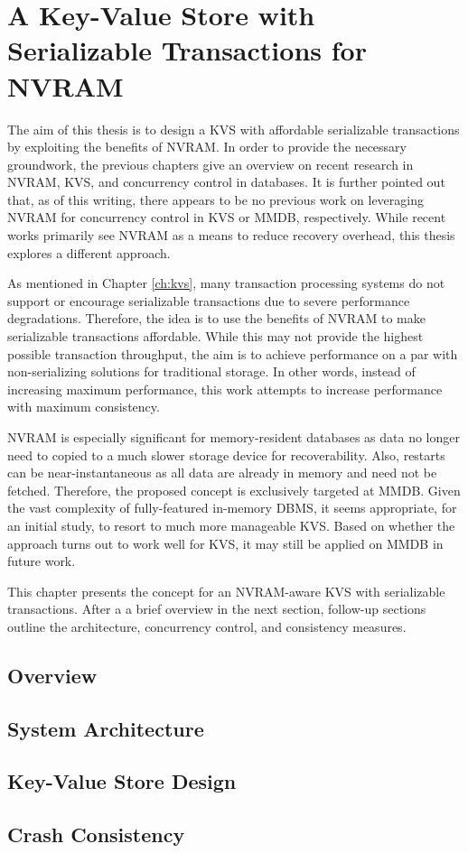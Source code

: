 \chapter{A Key-Value Store with Serializable Transactions for NVRAM}
\label{ch:concept}

The aim of this thesis is to design a KVS with affordable serializable
transactions by exploiting the benefits of NVRAM. In order to provide the
necessary groundwork, the previous chapters give an overview on recent research
in NVRAM, KVS, and concurrency control in databases. It is further pointed out
that, as of this writing, there appears to be no previous work on leveraging
NVRAM for concurrency control in KVS or MMDB, respectively. While recent works
primarily see NVRAM as a means to reduce recovery overhead, this thesis explores
a different approach.

As mentioned in Chapter \ref{ch:kvs}, many transaction processing systems do not
support or encourage serializable transactions due to severe performance
degradations. Therefore, the idea is to use the benefits of NVRAM to make
serializable transactions affordable. While this may not provide the highest
possible transaction throughput, the aim is to achieve performance on a par with
non-serializing solutions for traditional storage. In other words, instead of
increasing maximum performance, this work attempts to increase performance with
maximum consistency.

NVRAM is especially significant for memory-resident databases as data no longer
need to copied to a much slower storage device for recoverability. Also,
restarts can be near-instantaneous as all data are already in memory and need
not be fetched. Therefore, the proposed concept is exclusively targeted at MMDB.
Given the vast complexity of fully-featured in-memory DBMS, it seems
appropriate, for an initial study, to resort to much more manageable KVS. Based
on whether the approach turns out to work well for KVS, it may still be applied
on MMDB in future work.

This chapter presents the concept for an NVRAM-aware KVS with serializable
transactions. After a a brief overview in the next section, follow-up sections
outline the architecture, concurrency control, and consistency measures.

\section{Overview}
\label{ch:concept-overview}


\section{System Architecture}
\label{ch:concept-system}


\section{Key-Value Store Design}
\label{ch:concept-kvs}


\section{Crash Consistency}
\label{ch:concept-consistency}

